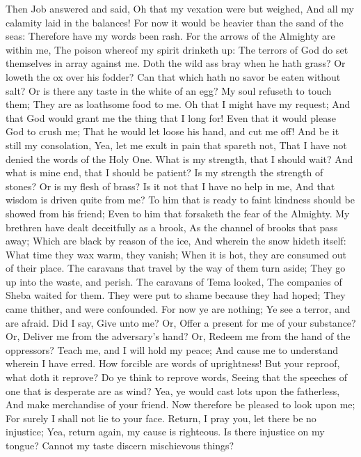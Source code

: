 Then Job answered and said,  Oh that my vexation were but weighed, And all my calamity laid in the balances!  For now it would be heavier than the sand of the seas: Therefore have my words been rash.  For the arrows of the Almighty are within me, The poison whereof my spirit drinketh up: The terrors of God do set themselves in array against me.  Doth the wild ass bray when he hath grass? Or loweth the ox over his fodder?  Can that which hath no savor be eaten without salt? Or is there any taste in the white of an egg?  My soul refuseth to touch them; They are as loathsome food to me.  Oh that I might have my request; And that God would grant me the thing that I long for!  Even that it would please God to crush me; That he would let loose his hand, and cut me off!  And be it still my consolation, Yea, let me exult in pain that spareth not, That I have not denied the words of the Holy One.  What is my strength, that I should wait? And what is mine end, that I should be patient?  Is my strength the strength of stones? Or is my flesh of brass?  Is it not that I have no help in me, And that wisdom is driven quite from me?  To him that is ready to faint kindness should be showed from his friend; Even to him that forsaketh the fear of the Almighty.  My brethren have dealt deceitfully as a brook, As the channel of brooks that pass away;  Which are black by reason of the ice, And wherein the snow hideth itself:  What time they wax warm, they vanish; When it is hot, they are consumed out of their place.  The caravans that travel by the way of them turn aside; They go up into the waste, and perish.  The caravans of Tema looked, The companies of Sheba waited for them.  They were put to shame because they had hoped; They came thither, and were confounded.  For now ye are nothing; Ye see a terror, and are afraid.  Did I say, Give unto me? Or, Offer a present for me of your substance?  Or, Deliver me from the adversary’s hand? Or, Redeem me from the hand of the oppressors?  Teach me, and I will hold my peace; And cause me to understand wherein I have erred.  How forcible are words of uprightness! But your reproof, what doth it reprove?  Do ye think to reprove words, Seeing that the speeches of one that is desperate are as wind?  Yea, ye would cast lots upon the fatherless, And make merchandise of your friend.  Now therefore be pleased to look upon me; For surely I shall not lie to your face.  Return, I pray you, let there be no injustice; Yea, return again, my cause is righteous.  Is there injustice on my tongue? Cannot my taste discern mischievous things? 

